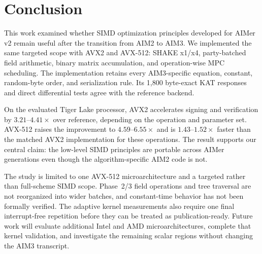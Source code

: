\section{Conclusion}
\label{sec:conc}

This work examined whether SIMD optimization principles developed for AIMer v2
remain useful after the transition from AIM2 to AIM3.  We implemented the same
targeted scope with AVX2 and AVX-512: SHAKE x1/x4, party-batched field
arithmetic, binary matrix accumulation, and operation-wise MPC scheduling.
The implementation retains every AIM3-specific equation, constant, random-byte
order, and serialization rule.  Its 1,800 byte-exact KAT responses and direct
differential tests agree with the reference backend.

On the evaluated Tiger Lake processor, AVX2 accelerates signing and
verification by $3.21$--$4.41\times$ over reference, depending on the operation
and parameter set.  AVX-512 raises the improvement to $4.59$--$6.55\times$ and
is $1.43$--$1.52\times$ faster than the matched AVX2 implementation for these
operations.  The result supports our central claim: the low-level SIMD
principles are portable across AIMer generations even though the
algorithm-specific AIM2 code is not.

The study is limited to one AVX-512 microarchitecture and a targeted rather
than full-scheme SIMD scope.  Phase~2/3 field operations and tree traversal are
not reorganized into wider batches, and constant-time behavior has not been
formally verified.  The adaptive kernel measurements also require one final
interrupt-free repetition before they can be treated as publication-ready.
Future work will evaluate additional Intel and AMD microarchitectures, complete
that kernel validation, and investigate the remaining scalar regions without
changing the AIM3 transcript.
